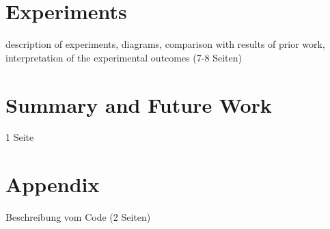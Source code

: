 \documentclass[
     12pt,         %
     a4paper,      %
     DIV=14,        %
     ]{scrreprt}
\begin{document}
\chapter{Experiments}
\label{chap:experiments}

description of experiments, diagrams, comparison with results of prior work, interpretation of the experimental outcomes (7-8 Seiten)

\chapter{Summary and Future Work}
\label{chap:summary}
1 Seite


\chapter{Appendix}
\label{chap:appendix}
Beschreibung vom Code (2 Seiten)












\end{document}
